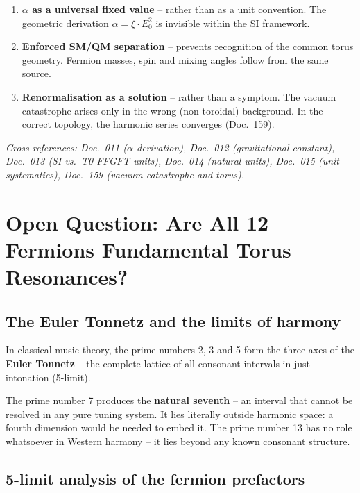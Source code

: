 \begin{enumerate}
    \item \textbf{$\alpha$ as a universal fixed value} -- rather than
          as a unit convention. The geometric derivation
          $\alpha = \xi \cdot E_0^2$ is invisible within the SI framework.

    \item \textbf{Enforced SM/QM separation} -- prevents recognition
          of the common torus geometry. Fermion masses, spin and
          mixing angles follow from the same source.

    \item \textbf{Renormalisation as a solution} -- rather than a
          symptom. The vacuum catastrophe arises only in the wrong
          (non-toroidal) background. In the correct topology, the
          harmonic series converges (Doc.~159).
\end{enumerate}

\noindent\textit{Cross-references: Doc.~011 ($\alpha$ derivation),
Doc.~012 (gravitational constant), Doc.~013 (SI vs.\ T0-FFGFT units),
Doc.~014 (natural units), Doc.~015 (unit systematics),
Doc.~159 (vacuum catastrophe and torus).}


\section{Open Question: Are All 12 Fermions Fundamental Torus Resonances?}

\subsection{The Euler Tonnetz and the limits of harmony}

In classical music theory, the prime numbers 2, 3 and 5 form the
three axes of the \textbf{Euler Tonnetz} -- the complete lattice of
all consonant intervals in just intonation (5-limit).

The prime number 7 produces the \textbf{natural seventh} -- an interval
that cannot be resolved in any pure tuning system. It lies literally
outside harmonic space: a fourth dimension would be needed to embed
it. The prime number 13 has no role whatsoever in Western harmony --
it lies beyond any known consonant structure.

\subsection{5-limit analysis of the fermion prefactors}

